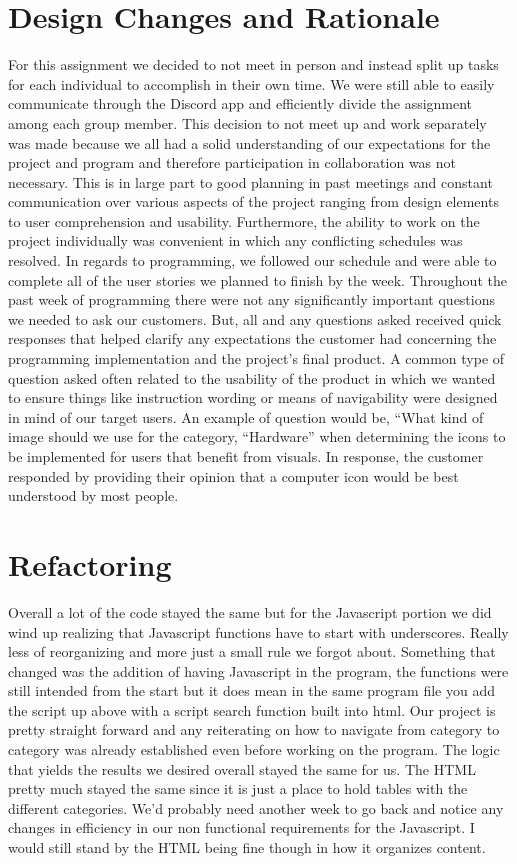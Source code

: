 \documentclass[12pt, letterpaper]{article}
\begin{document}
	\section{Design Changes and Rationale}
For this assignment we decided to not meet in person and instead split up tasks for each individual to accomplish in their own time.  We were still able to easily communicate through the Discord app and efficiently divide the assignment among each group member.  This decision to not meet up and work separately was made because we all had a solid understanding of our expectations for the project and program and therefore participation in collaboration was not necessary.  This is in large part to good planning in past meetings and constant communication over various aspects of the project ranging from design elements to user comprehension and usability.  Furthermore, the ability to work on the project individually was convenient in which any conflicting schedules was resolved.  In regards to programming, we followed our schedule and were able to complete all of the user stories we planned to finish by the week.  
Throughout the past week of programming there were not any significantly important questions we needed to ask our customers.  But, all and any questions asked received quick responses that helped clarify any expectations the customer had concerning the programming implementation and the project’s final product.  A common type of question asked often related to the usability of the product in which we wanted to ensure things like instruction wording or means of navigability were designed in mind of our target users.  An example of question would be, “What kind of image should we use for the category, “Hardware” when determining the icons to be implemented for users that benefit from visuals.  In response, the customer responded by providing their opinion that a computer icon would be best understood by most people.

\section{Refactoring}
Overall a lot of the code stayed the same but for the Javascript portion we did wind up realizing that Javascript functions have to start with underscores. Really less of reorganizing and more just a small rule we forgot about. Something that changed was the addition of having Javascript in the program, the functions were still intended from the start but it does mean in the same program file you add the script up above with a script search function built into html.  Our project is pretty straight forward and any reiterating on how to navigate from category to category was already established even before working on the program. The logic that yields the results we desired overall stayed the same for us. The HTML pretty much stayed the same since it is just a place to hold tables with the different categories. We’d probably need another week to go back and notice any changes in efficiency in our non functional requirements for the Javascript. I would still stand by the HTML being fine though in how it organizes content.
\end{document}
